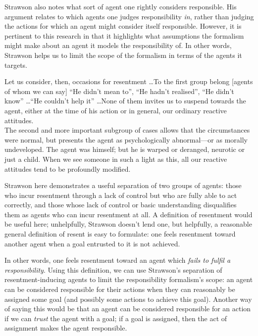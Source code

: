 Strawson also notes what sort of agent one rightly considers responsible. His argument relates to which agents one judges responsibility \emph{in}, rather than judging the actions for which an agent might consider itself responsible. However, it is pertinent to this research in that it highlights what assumptions the formalism might make about an agent it models the responsibility of. In other words, Strawson helps us to limit the scope of the formalism in terms of the agents it targets.\par

\begin{displayquote}
    Let us consider, then, occasions for resentment \ldots{}To the first group belong [agents of whom we can say] ``He didn't mean to'', ``He hadn't realised'', ``He didn't know'' \ldots{}``He couldn't help it'' \ldots{}None of them invites us to suspend towards the agent, either at the time of his action or in general, our ordinary reactive attitudes.\\
    The second and more important subgroup of cases allows that the circumstances were normal, but presents the agent as psychologically abnormal—or as morally undeveloped. The agent was himself; but he is warped or deranged, neurotic or just a child. When we see someone in such a light as this, all our reactive attitudes tend to be profoundly modified.\\
\end{displayquote} \parencite{strawson}

Strawson here demonstrates a useful separation of two groups of agents: those who incur resentment through a lack of control but who are fully able to act correctly, and those whose lack of control or basic understanding disqualifies them as agents who can incur resentment at all. A definition of resentment would be useful here; unhelpfully, Strawson doesn't lend one, but helpfully, a reasonable general definition of resent is easy to formulate: one feels resentment toward another agent when a goal entrusted to it is not achieved.\par

In other words, one feels resentment toward an agent which \emph{fails to fulfil a responsibility}. Using this definition, we can use Strawson's separation of resentment-inducing agents to limit the responsibility formalism's scope: an agent can be considered responsible for their actions when they can reasonably be assigned some goal (and possibly some actions to achieve this goal). Another way of saying this would be that an agent can be considered responsible for an action if we can \emph{trust} the agent with a goal; if a goal is assigned, then the act of assignment makes the agent responsible.\par

